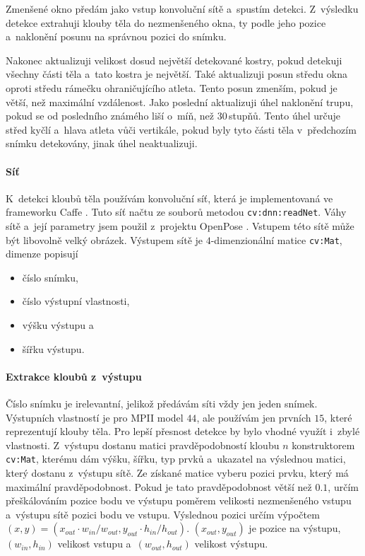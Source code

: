 Zmenšené okno předám jako vstup konvoluční sítě a~spustím detekci. Z~výsledku detekce extrahuji klouby těla do nezmenšeného okna, ty podle jeho pozice a~naklonění posunu na správnou pozici do snímku.

Nakonec aktualizuji velikost dosud největší detekované kostry, pokud detekuji všechny části těla a~tato kostra je největší. Také aktualizuji posun středu okna oproti středu rámečku ohraničujícího atleta. Tento posun zmenším, pokud je větší, než maximální vzdálenost. Jako poslední aktualizuji úhel naklonění trupu, pokud se od posledního známého liší o~míň, než $30$\,\rm stupňů. Tento úhel určuje střed kyčlí a~hlava atleta vůči vertikále, pokud byly tyto části těla v~předchozím snímku detekovány, jinak úhel neaktualizuji.

\paragraph{Síť}

K~detekci kloubů těla používám konvoluční síť, která je implementovaná ve frameworku Caffe \citep{Caffe}. Tuto síť načtu ze souborů metodou \texttt{cv\::dnn\::readNet}. Váhy sítě a~její parametry jsem použil z~projektu OpenPose \citep{OpenPose}. Vstupem této sítě může být libovolně velký obrázek. Výstupem sítě je $4$-dimenzionální matice \texttt{cv\::Mat}, dimenze popisují
\begin{itemize}
\item číslo snímku,
\item číslo výstupní vlastnosti,
\item výšku výstupu a
\item šířku výstupu.
\end{itemize}

\paragraph{Extrakce kloubů z~výstupu}

Číslo snímku je irelevantní, jelikož předávám síti vždy jen jeden snímek. Výstupních vlastností je pro MPII model $44$, ale používám jen prvních $15$, které reprezentují klouby těla. Pro lepší přesnost detekce by bylo vhodné využít i~zbylé vlastnosti. Z~výstupu dostanu matici pravděpodobností kloubu $n$ konstruktorem \texttt{cv\::Mat}, kterému dám výšku, šířku, typ prvků a~ukazatel na výslednou matici, který dostanu z~výstupu sítě. Ze získané matice vyberu pozici prvku, který má maximální pravděpodobnost. Pokud je tato pravděpodobnost větší než $0.1$, určím přeškálováním pozice bodu ve výstupu poměrem velikosti nezmenšeného vstupu a~výstupu sítě pozici bodu ve vstupu. Výslednou pozici určím výpočtem $(x,y)=(x_{out}\cdot w_{in}/w_{out}, y_{out}\cdot h_{in}/h_{out})$. $(x_{out},y_{out})$ je pozice na výstupu, $(w_{in},h_{in})$ velikost vstupu a~$(w_{out},h_{out})$ velikost výstupu.

